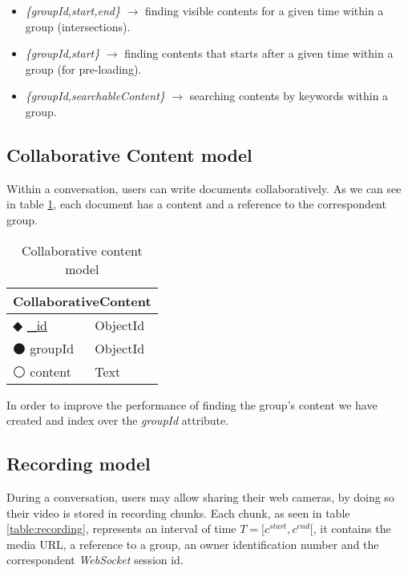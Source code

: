 \begin{itemize}
\item{\emph{\{groupId,start,end\}} $\rightarrow$ finding visible contents for a given time  within a group (intersections).}
\item{\emph{\{groupId,start\}} $\rightarrow$  finding contents that starts after a given time within a group (for pre-loading).}
\item{\emph{\{groupId,searchableContent\}} $\rightarrow$ searching contents by keywords within a group.}  
\end{itemize}

\subsection{Collaborative Content model}

Within a conversation, users can write documents collaboratively. As we can see in table \ref{table:collaborative}, each document has a content and a reference to the correspondent group. 


\begin{table}[!htb]
\centering
    \caption{Collaborative content model}
    \label{table:collaborative}
    \begin{tabular}{|ll|}
        \hline
        \multicolumn{2}{|c|}{\textbf{CollaborativeContent}}  \\ \hline
        $\Diamondblack$ \underline{\_id}  & ObjectId           \\ 
        $\medbullet$ groupId            & ObjectId           \\ 
        $\medcirc$ content            & Text               \\ \hline
    \end{tabular}
\end{table}

In order to improve the performance of finding the group's content we have created and index over the \emph{groupId} attribute.

\subsection{Recording model}

During a conversation, users may allow sharing their web cameras, by doing so their video is stored in recording chunks. Each chunk, as seen in table \ref{table:recording}, represents an interval of time  $T=\big[c^{start},c^{end}\big[$, it contains the media \ac{URL}, a reference to a group, an owner identification number and the correspondent \emph{WebSocket} session id.

